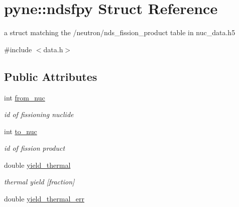 \hypertarget{structpyne_1_1ndsfpy}{}\section{pyne\+:\+:ndsfpy Struct Reference}
\label{structpyne_1_1ndsfpy}


a struct matching the \textquotesingle{}/neutron/nds\+\_\+fission\+\_\+product\textquotesingle{} table in nuc\+\_\+data.\+h5  




{\ttfamily \#include $<$data.\+h$>$}

\subsection*{Public Attributes}
\begin{DoxyCompactItemize}
\item 
int \hyperlink{structpyne_1_1ndsfpy_ad2cb8c35a387624f95c5318f259834db}{from\+\_\+nuc}\hypertarget{structpyne_1_1ndsfpy_ad2cb8c35a387624f95c5318f259834db}{}\label{structpyne_1_1ndsfpy_ad2cb8c35a387624f95c5318f259834db}

\begin{DoxyCompactList}\small\item\em id of fissioning nuclide \end{DoxyCompactList}\item 
int \hyperlink{structpyne_1_1ndsfpy_aeabd96ca1b30be7381853ca0ccd75f31}{to\+\_\+nuc}\hypertarget{structpyne_1_1ndsfpy_aeabd96ca1b30be7381853ca0ccd75f31}{}\label{structpyne_1_1ndsfpy_aeabd96ca1b30be7381853ca0ccd75f31}

\begin{DoxyCompactList}\small\item\em id of fission product \end{DoxyCompactList}\item 
double \hyperlink{structpyne_1_1ndsfpy_a802ebba1436e6e7ca9595e77698310e8}{yield\+\_\+thermal}\hypertarget{structpyne_1_1ndsfpy_a802ebba1436e6e7ca9595e77698310e8}{}\label{structpyne_1_1ndsfpy_a802ebba1436e6e7ca9595e77698310e8}

\begin{DoxyCompactList}\small\item\em thermal yield \mbox{[}fraction\mbox{]} \end{DoxyCompactList}\item 
double \hyperlink{structpyne_1_1ndsfpy_affaf73e5d64d7e9e94f63c6807b7b17e}{yield\+\_\+thermal\+\_\+err}\hypertarget{structpyne_1_1ndsfpy_affaf73e5d64d7e9e94f63c6807b7b17e}{}\label{structpyne_1_1ndsfpy_affaf73e5d64d7e9e94f63c6807b7b17e}


\end{DoxyCompactItemize}
